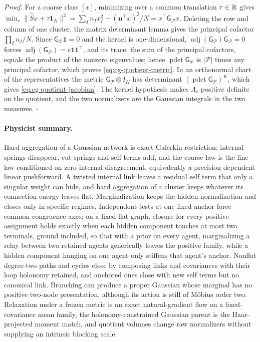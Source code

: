 \noindent\emph{Proof.}
For a coarse class \([x]\), minimizing over a common translation \(\tau\in\mathbb R\)
gives
\(\min_\tau\|\widehat Sx+\tau\mathbf1_N\|^2
=\sum_In_Ix_I^2-(\mathbf n^\top x)^2/N=x^\top\mathsf G_{\mathcal P}x\).
Deleting the row and column of one cluster, the matrix determinant lemma gives
the principal cofactor \(\prod_In_I/N\). Since
\(\mathsf G_{\mathcal P}\mathbf1=0\) and the kernel is one-dimensional,
\(\operatorname{adj}(\mathsf G_{\mathcal P})\mathsf G_{\mathcal P}=0\) forces
\(\operatorname{adj}(\mathsf G_{\mathcal P})=\mathrm c\mathbf1\mathbf1^\top\), and its
trace, the sum of the principal cofactors, equals the product of the nonzero
eigenvalues; hence \(\operatorname{pdet}\mathsf G_{\mathcal P}\) is
\(|\mathcal P|\) times any principal cofactor, which proves
\eqref{eq:cg-quotient-metric}. In an orthonormal chart of the representatives
the metric \(\mathsf G_{\mathcal P}\otimes I_K\) has determinant
\((\operatorname{pdet}\mathsf G_{\mathcal P})^K\), which gives
\eqref{eq:cg-quotient-jacobian}. The kernel hypothesis makes
\(\Lambda_{\mathrm c}\) positive definite on the quotient, and the two
normalizers are the Gaussian integrals in the two measures. \(\square\)

\paragraph{Physicist summary.}
Hard aggregation of a Gaussian network is exact Galerkin restriction: internal
springs disappear, cut springs and self terms add, and the coarse law is the
fine law conditioned on zero internal disagreement, equivalently a
precision-dependent linear pushforward. A twisted internal link leaves a
residual self term that only a singular weight can hide, and hard aggregation
of a cluster keeps whatever its connection energy leaves flat. Marginalization
keeps the hidden normalization and closes only in specific regimes. Independent
tests at one fixed anchor force common congruence axes; on a fixed flat graph,
closure for every positive assignment holds exactly when each hidden component
touches at most two terminals, ground included, so that with a prior on every
agent, marginalizing a relay between two retained agents generically leaves the
positive family, while a hidden component hanging on one agent only stiffens
that agent's anchor. Nonflat degree-two paths and cycles close by composing
links and covariances with their loop holonomy retained, and anchored ones close
with new self terms but no canonical link. Branching can produce a proper
Gaussian whose marginal has no positive two-node presentation, although its
action is still of M\"obius order two. Relaxation under a frozen metric is an
exact natural-gradient flow on a fixed-covariance mean family, the
holonomy-constrained Gaussian parent is the Haar-projected moment match, and
quotient volumes change raw normalizers without supplying an intrinsic blocking
scale.
